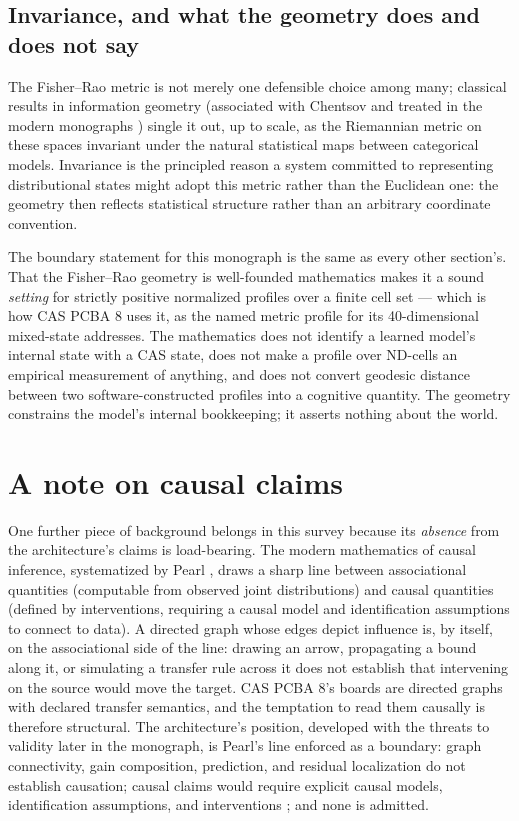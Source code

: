 \subsection{Invariance, and what the geometry does and does not say}\label{ch02:infogeo:invariance}

The Fisher--Rao metric is not merely one defensible choice among many;
classical results in information geometry (associated with Chentsov and
treated in the modern monographs \cite{amari,ay}) single it out, up to
scale, as the Riemannian metric on these spaces invariant under the
natural statistical maps between categorical models. Invariance is the
principled reason a system committed to representing distributional
states might adopt this metric rather than the Euclidean one: the
geometry then reflects statistical structure rather than an arbitrary
coordinate convention.

The boundary statement for this monograph is the same as every other
section's. That the Fisher--Rao geometry is well-founded mathematics
\cite{fisher,rao,amari,ay} makes it a sound \emph{setting} for
strictly positive normalized profiles over a finite cell set --- which
is how CAS PCBA 8 uses it, as the named metric profile for its
40-dimensional mixed-state addresses. The mathematics does not identify
a learned model's internal state with a CAS state, does not make a
profile over ND-cells an empirical measurement of anything, and does
not convert geodesic distance between two software-constructed profiles
into a cognitive quantity. The geometry constrains the model's internal
bookkeeping; it asserts nothing about the world.

\section{A note on causal claims}\label{ch02:causal}

One further piece of background belongs in this survey because its
\emph{absence} from the architecture's claims is load-bearing. The
modern mathematics of causal inference, systematized by Pearl
\cite{pearl}, draws a sharp line between associational quantities
(computable from observed joint distributions) and causal quantities
(defined by interventions, requiring a causal model and identification
assumptions to connect to data). A directed graph whose edges depict
influence is, by itself, on the associational side of the line: drawing
an arrow, propagating a bound along it, or simulating a transfer rule
across it does not establish that intervening on the source would move
the target. CAS PCBA 8's boards are directed graphs with declared
transfer semantics, and the temptation to read them causally is
therefore structural. The architecture's position, developed with the
threats to validity later in the monograph, is Pearl's line enforced as
a boundary: graph connectivity, gain composition, prediction, and
residual localization do not establish causation; causal claims would
require explicit causal models, identification assumptions, and
interventions \cite{pearl}; and none is admitted.


